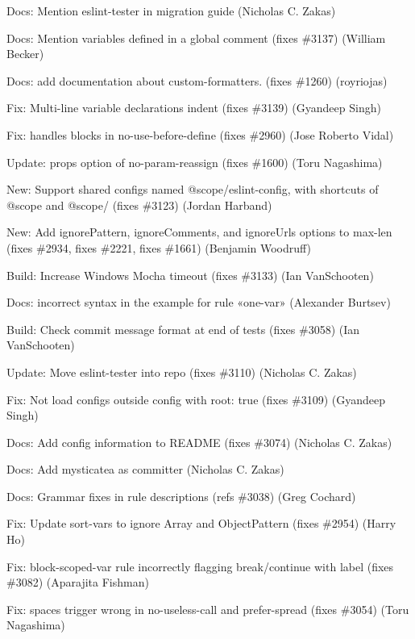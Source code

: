 \begin{DoxyItemize}
\item Docs\+: Mention eslint-\/tester in migration guide (Nicholas C. Zakas)
\item Docs\+: Mention variables defined in a global comment (fixes \#3137) (William Becker)
\item Docs\+: add documentation about custom-\/formatters. (fixes \#1260) (royriojas)
\item Fix\+: Multi-\/line variable declarations indent (fixes \#3139) (Gyandeep Singh)
\item Fix\+: handles blocks in no-\/use-\/before-\/define (fixes \#2960) (Jose Roberto Vidal)
\item Update\+: {\ttfamily props} option of {\ttfamily no-\/param-\/reassign} (fixes \#1600) (Toru Nagashima)
\item New\+: Support shared configs named {\ttfamily @scope/eslint-\/config}, with shortcuts of {\ttfamily @scope} and {\ttfamily @scope/} (fixes \#3123) (Jordan Harband)
\item New\+: Add ignore\+Pattern, ignore\+Comments, and ignore\+Urls options to max-\/len (fixes \#2934, fixes \#2221, fixes \#1661) (Benjamin Woodruff)
\item Build\+: Increase Windows Mocha timeout (fixes \#3133) (Ian Van\+Schooten)
\item Docs\+: incorrect syntax in the example for rule «one-\/var» (Alexander Burtsev)
\item Build\+: Check commit message format at end of tests (fixes \#3058) (Ian Van\+Schooten)
\item Update\+: Move eslint-\/tester into repo (fixes \#3110) (Nicholas C. Zakas)
\item Fix\+: Not load configs outside config with {\ttfamily root\+: true} (fixes \#3109) (Gyandeep Singh)
\item Docs\+: Add config information to R\+E\+A\+D\+ME (fixes \#3074) (Nicholas C. Zakas)
\item Docs\+: Add mysticatea as committer (Nicholas C. Zakas)
\item Docs\+: Grammar fixes in rule descriptions (refs \#3038) (Greg Cochard)
\item Fix\+: Update sort-\/vars to ignore Array and Object\+Pattern (fixes \#2954) (Harry Ho)
\item Fix\+: block-\/scoped-\/var rule incorrectly flagging break/continue with label (fixes \#3082) (Aparajita Fishman)
\item Fix\+: spaces trigger wrong in {\ttfamily no-\/useless-\/call} and {\ttfamily prefer-\/spread} (fixes \#3054) (Toru Nagashima)

\end{DoxyItemize}
